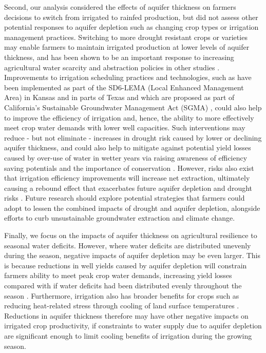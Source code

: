 \documentclass[
]{article}
\begin{document}
Second, our analysis considered the effects of aquifer thickness on farmers decisions to switch from irrigated to rainfed production, but did not assess other potential responses to aquifer depletion such as changing crop types or irrigation management practices. Switching to more drought resistant crops or varieties may enable farmers to maintain irrigated production at lower levels of aquifer thickness, and has been shown to be an important response to increasing agricultural water scarcity and abstraction policies in other studies \citep{bhattarai2021impact, deines2019quantifying, manning2017producer}. Improvements to irrigation scheduling practices and technologies, such as have been implemented as part of the SD6-LEMA (Local Enhanced Management Area) in Kansas \citep{deines2019quantifying, glose2022quantifying} and in parts of Texas \citep{mrad2020peak} and which are proposed as part of California's Sustainable Groundwater Management Act (SGMA) \citep{berbel2019droughts, lubell2020sustainable}, could also help to improve the efficiency of irrigation and, hence, the ability to more effectively meet crop water demands with lower well capacities. Such interventions may reduce - but not eliminate - increases in drought risk caused by lower or declining aquifer thickness, and could also help to mitigate against potential yield losses caused by over-use of water in wetter years via raising awareness of efficiency saving potentials \citep{foster2019assessing} and the importance of conservation \citep{marston2022}. However, risks also exist that irrigation efficiency improvements will increase net extraction, ultimately causing a rebound effect that exacerbates future aquifer depletion and drought risks \citep{grafton2018paradox, perez2021agricultural}. Future research should explore potential strategies that farmers could adopt to lessen the combined impacts of drought and aquifer depletion, alongside efforts to curb unsustainable groundwater extraction and climate change.

Finally, we focus on the impacts of aquifer thickness on agricultural resilience to seasonal water deficits. However, where water deficits are distributed unevenly during the season, negative impacts of aquifer depletion may be even larger. This is because reductions in well yields caused by aquifer depletion will constrain farmers ability to meet peak crop water demands, increasing yield losses compared with if water deficits had been distributed evenly throughout the season \citep{ortiz2019unpacking}. Furthermore, irrigation also has broader benefits for crops such as reducing heat-related stress through cooling of land surface temperatures \citep{adegoke2003impact, bonfils2007empirical, lobell2008effect, zhu2022untangling}. Reductions in aquifer thickness therefore may have other negative impacts on irrigated crop productivity, if constraints to water supply due to aquifer depletion are significant enough to limit cooling benefits of irrigation during the growing season.
\end{document}
